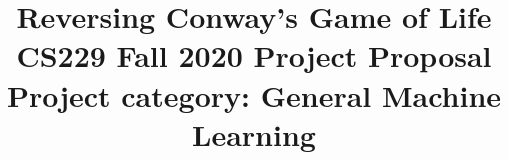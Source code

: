 \documentclass[conference]{IEEEtran}
\begin{document}
\title{Reversing Conway's Game of Life\\
{\footnotesize CS229 Fall 2020 Project Proposal \hspace{2cm}
Project category: General Machine Learning}
}



\author{
\and
{}
\and
{}
}

\maketitle


\begin{comment}
\begin{IEEEkeywords}
convolutional neural networks, Kaggle competition, game, simulators
\end{IEEEkeywords}
\end{comment}
\end{document}

